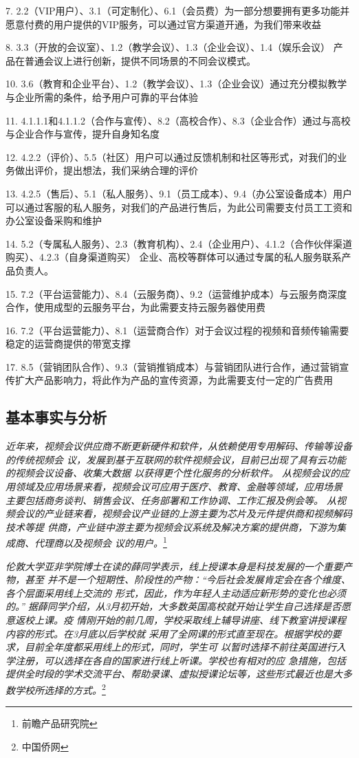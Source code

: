\documentclass[a4paper,12pt]{article}
\begin{document}
    7. 2.2（VIP用户）、3.1（可定制化）、6.1（会员费）为一部分想要拥有更多功能并愿意付费的用户提供的VIP服务，可以通过官方渠道开通，为我们带来收益

    8. 3.3（开放的会议室）、1.2（教学会议）、1.3（企业会议）、1.4（娱乐会议） 产品在普通会议上进行创新，提供不同场景的不同会议模式。

    10. 3.6（教育和企业平台）、1.2（教学会议）、1.3（企业会议）通过充分模拟教学与企业所需的条件，给予用户可靠的平台体验

    11. 4.1.1.1和4.1.1.2（合作与宣传）、8.2（高校合作）、8.3（企业合作）通过与高校与企业合作与宣传，提升自身知名度

    12. 4.2.2（评价）、5.5（社区）用户可以通过反馈机制和社区等形式，对我们的业务做出评价，提出想法，我们采纳合理的评价

    13. 4.2.5（售后）、5.1（私人服务）、9.1（员工成本）、9.4（办公室设备成本）用户可以通过客服的私人服务，对我们的产品进行售后，为此公司需要支付员工工资和办公室设备采购和维护

    14. 5.2（专属私人服务）、2.3（教育机构）、2.4（企业用户）、4.1.2（合作伙伴渠道购买）、4.2.3（自身渠道购买） 企业、高校等群体可以通过专属的私人服务联系产品负责人。

    15. 7.2（平台运营能力）、8.4（云服务商）、9.2（运营维护成本）与云服务商深度合作，使用成型的云服务平台，为此需要支持云服务器使用费

    16. 7.2（平台运营能力）、8.1（运营商合作）对于会议过程的视频和音频传输需要稳定的运营商提供的带宽支撑

    17. 8.5（营销团队合作）、9.3（营销推销成本）与营销团队进行合作，通过营销宣传扩大产品影响力，将此作为产品的宣传资源，为此需要支付一定的广告费用
    \subsection{基本事实与分析}
    \textit{近年来，视频会议供应商不断更新硬件和软件，从依赖使用专用解码、传输等设备的传统视频会
    议，发展到基于互联网的软件视频会议，目前已出现了具有云功能的视频会议设备、收集大数据
    以获得更个性化服务的分析软件。
    从视频会议的应用领域及应用场景来看，视频会议可应用于医疗、教育、金融等领域，应用场景
    主要包括商务谈判、销售会议、任务部署和工作协调、工作汇报及例会等。
    从视频会议的产业链来看，视频会议产业链的上游主要为芯片及元件提供商和视频解码技术等提
    供商，产业链中游主要为视频会议系统及解决方案的提供商，下游为集成商、代理商以及视频会
    议的用户。}\footnote{前瞻产品研究院}

    \textit{伦敦大学亚非学院博士在读的薛同学表示，线上授课本身是科技发展的一个重要产物，甚至
    并不是一个短期性、阶段性的产物：“今后社会发展肯定会在各个维度、各个层面采用线上交流的
    形式，因此，作为年轻人主动适应新形势的变化也必须的。”
    据薛同学介绍，从3月初开始，大多数英国高校就开始让学生自己选择是否愿意返校上课。疫
    情刚开始的前几周，学校采取线上辅导讲座、线下教室讲授课程内容的形式。在3月底以后学校就
    采用了全网课的形式直至现在。根据学校的要求，目前全年度都采用线上的形式，同时，学生可
    以暂时选择不前往英国进行入学注册，可以选择在各自的国家进行线上听课。学校也有相对的应
    急措施，包括提供全时段的学术交流平台、帮助录课、虚拟授课论坛等，这些形式最近也是大多
    数学校所选择的方式。}\footnote{中国侨网}
\end{document}
